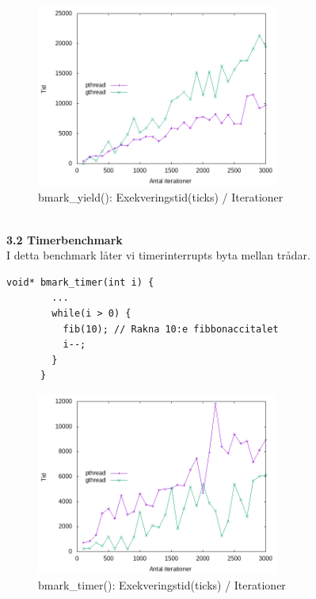 \documentclass[a4paper,10pt]{article}
\begin{document}
    \begin{figure}[htp]
      \centering
      \includegraphics[width=8cm]{benchmarks/yieldtest.png}
      \caption{bmark\_yield(): Exekveringstid(ticks) / Iterationer}
      \label{fig:Graph}
    \end{figure}
    
    \maketitle
    \textbf
        {\\3.2 Timerbenchmark\\}
        I detta benchmark låter vi timerinterrupts byta mellan trådar.
            \begin{lstlisting}[style=CStyle]
      void* bmark_timer(int i) {
        ...
        while(i > 0) {
          fib(10); // Rakna 10:e fibbonaccitalet
          i--;
        }
      } \end{lstlisting}
         \begin{figure}[htp]
           \centering
           \includegraphics[width=8cm]{benchmarks/timertest.png}
           \caption{bmark\_timer(): Exekveringstid(ticks) / Iterationer}
           \label{fig:Graph}
         \end{figure}
         
\end{document}
